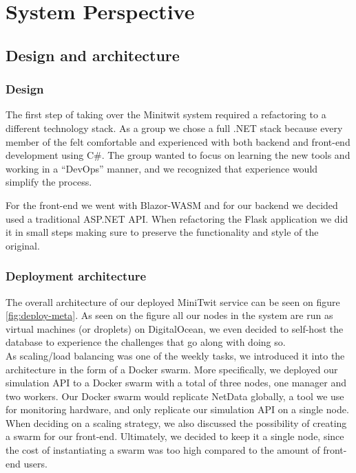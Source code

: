 \section{System Perspective}
\subsection{Design and architecture}

\subsubsection{Design}
The first step of taking over the Minitwit system required a refactoring to a different technology stack. 
As a group we chose a full .NET stack because every member of the felt comfortable and experienced with both backend and front-end development using C\#. The group wanted to focus on learning the new tools and working in a “DevOps” manner, and we recognized that experience would simplify the process.

For the front-end we went with Blazor-WASM and for our backend we decided used a traditional ASP.NET API. When refactoring the Flask application we did it in small steps making sure to preserve the functionality and style of the original.

\subsubsection{Deployment architecture}
The overall architecture of our deployed MiniTwit service can be seen on figure \ref{fig:deploy-meta}. As seen on the figure all our nodes in the system are run as virtual machines (or droplets) on DigitalOcean, we even decided to self-host the database to experience the challenges that go along with doing so.
\\
As scaling/load balancing was one of the weekly tasks, we introduced it into the architecture in the form of a Docker swarm. More specifically, we deployed our simulation API to a Docker swarm with a total of three nodes, one manager and two workers. Our Docker swarm would replicate NetData globally, a tool we use for monitoring hardware, and only replicate our simulation API on a single node.
When deciding on a scaling strategy, we also discussed the possibility of creating a swarm for our front-end. Ultimately, we decided to keep it a single node, since the cost of instantiating a swarm was too high compared to the amount of front-end users.

